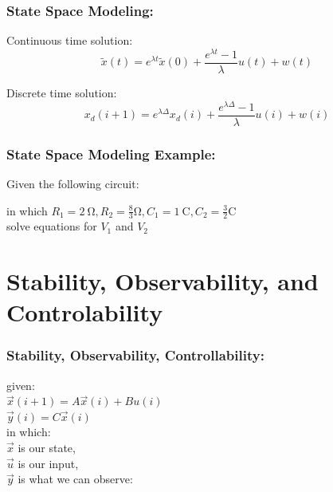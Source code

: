 \documentclass{beamer}
\begin{document}
\begin{frame}
\frametitle{State Space Modeling:}

Continuous time solution: 
\[
    \tilde{x}(t) = e^{\lambda t} \tilde x(0) + \frac{e^{\lambda t} - 1}{\lambda } u(t) + w(t)
\]

Discrete time solution:
\[
     x_{d}(i+1) = e^{\lambda \Delta} x_{d}(i) + \frac{e^{\lambda \Delta} - 1}{\lambda } u(i) + w(i)
\]
\end{frame}

\begin{frame}
\frametitle{State Space Modeling Example:}

Given the following circuit: 


in which $R_{1} = \SI{2}{\ohm}, R_{2} = \frac{8}{3} \si{\ohm}, C_{1} = \SI{1}{\coulomb}, C_{2} = \frac{3}{2} \si{\coulomb} $ \\
solve equations for $V_{1}$ and $V_{2}$
\end{frame}

\section[S,O,\&C]{Stability, Observability, and Controlability}

\begin{frame}
\frametitle{Stability, Observability, Controllability:}

given: \\ 
$\vec{x}(i+1) = A\vec{x}(i) + Bu(i)$ \\
$\vec{y}(i) = C\vec{x}(i)$ \\
in which: \\
$\vec{x}$ is our state, \\
$\vec{u}$ is our input, \\
$\vec{y}$ is what we can observe: \\
\end{frame}
\end{document}
